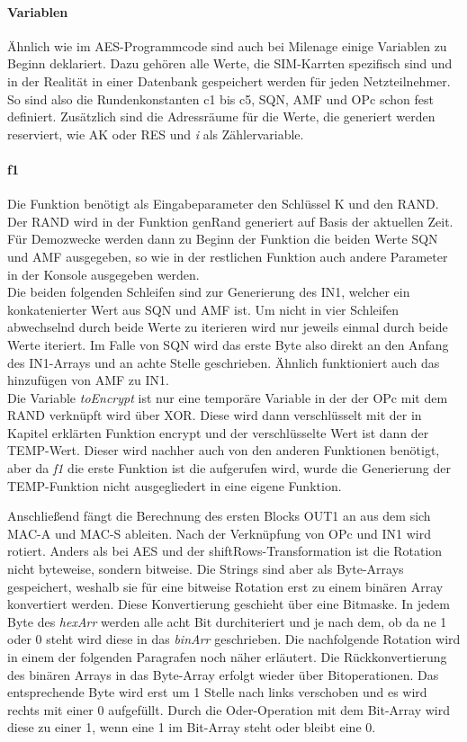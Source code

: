 		\paragraph{Variablen}
		Ähnlich wie im AES-Programmcode sind auch bei Milenage einige Variablen zu Beginn
		deklariert. Dazu gehören alle Werte, die SIM-Karrten spezifisch sind und in der
		Realität in einer Datenbank gespeichert werden für jeden Netzteilnehmer. So sind also
		die Rundenkonstanten c1 bis c5, SQN, AMF und OPc schon fest definiert. Zusätzlich sind
		die Adressräume für die Werte, die generiert werden reserviert, wie AK oder RES und \emph{i}
		als Zählervariable.
		
		\paragraph{f1}
		Die Funktion benötigt als Eingabeparameter den Schlüssel K und den RAND. Der RAND wird in der
		Funktion genRand generiert auf Basis der aktuellen Zeit. \\
		Für Demozwecke werden dann zu Beginn der Funktion die beiden Werte SQN und AMF ausgegeben, so
		wie in der restlichen Funktion auch andere Parameter in der Konsole ausgegeben werden. \\
		Die beiden folgenden Schleifen sind zur Generierung des IN1, welcher ein konkatenierter Wert aus
		SQN und AMF ist. Um nicht in vier Schleifen abwechselnd durch beide Werte zu iterieren wird nur
		jeweils einmal durch beide Werte iteriert. Im Falle von SQN wird das erste Byte also direkt an den
		Anfang des IN1-Arrays und an achte Stelle geschrieben. Ähnlich funktioniert auch das hinzufügen von
		AMF zu IN1. \\
		Die Variable \emph{toEncrypt} ist nur eine temporäre Variable in der der OPc mit dem RAND verknüpft
		wird über XOR. Diese wird dann verschlüsselt mit der in Kapitel  erklärten
		Funktion encrypt und der verschlüsselte Wert ist dann der TEMP-Wert. Dieser wird nachher auch von den
		anderen Funktionen benötigt, aber da \emph{f1} die erste Funktion ist die aufgerufen wird, wurde die
		Generierung der TEMP-Funktion nicht ausgegliedert in eine eigene Funktion.
		
		Anschließend fängt die Berechnung des ersten Blocks OUT1 an aus dem sich MAC-A und MAC-S ableiten. Nach
		der Verknüpfung von OPc und IN1 wird rotiert. Anders als bei AES und der shiftRows-Transformation ist die
		Rotation nicht byteweise, sondern bitweise. Die Strings sind aber als Byte-Arrays gespeichert, weshalb sie
		für eine bitweise Rotation erst zu einem binären Array konvertiert werden. Diese Konvertierung geschieht
		über eine Bitmaske. In jedem Byte des \emph{hexArr} werden alle acht Bit durchiteriert und je nach dem, ob
		da ne 1 oder 0 steht wird diese in das \emph{binArr} geschrieben. Die nachfolgende Rotation wird in einem
		der folgenden Paragrafen noch näher erläutert. Die Rückkonvertierung des binären Arrays in das
		Byte-Array erfolgt wieder über Bitoperationen. Das entsprechende Byte wird erst um 1 Stelle nach links
		verschoben und es wird rechts mit einer 0 aufgefüllt. Durch die Oder-Operation mit dem Bit-Array wird diese
		zu einer 1, wenn eine 1 im Bit-Array steht oder bleibt eine 0.
		
